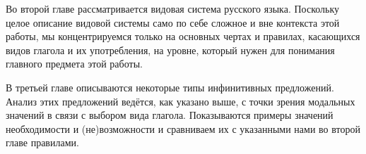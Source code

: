 Во второй главе рассматривается видовая система русского языка. Поскольку целое описание видовой системы само по себе сложное и вне контекста этой работы, мы концентрируемся только на основных чертах и правилах, касающихся видов глагола и их употребления, на уровне, который нужен для понимания главного предмета этой работы. 

В третьей главе описываются некоторые типы инфинитивных предложений.  Анализ этих предложений ведётся, как указано выше, с точки зрения модальных значений в связи с выбором вида глагола. Показываются примеры значений необходимости и (не)возможности и сравниваем их с указанными нами во второй главе правилами.

